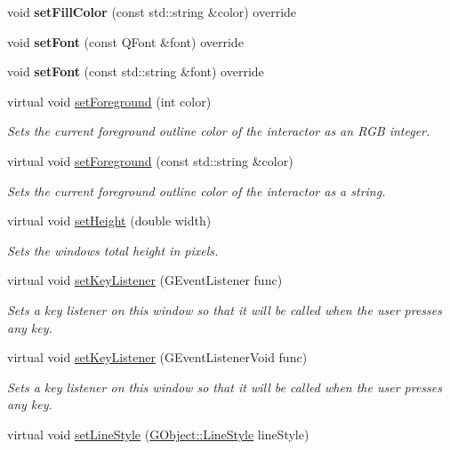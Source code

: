 \begin{DoxyCompactItemize}
void {\bfseries set\+Fill\+Color} (const std\+::string \&color) override
\item 
void {\bfseries set\+Font} (const Q\+Font \&font) override
\item 
void {\bfseries set\+Font} (const std\+::string \&font) override
\item 
virtual void \mbox{\hyperlink{classGDrawingSurface_a7daa57084b5811b598fce8726660b328}{set\+Foreground}} (int color)
\begin{DoxyCompactList}\small\item\em Sets the current foreground outline color of the interactor as an R\+GB integer. \end{DoxyCompactList}\item 
virtual void \mbox{\hyperlink{classGDrawingSurface_af59209aeadea6dfc6d97a2d8531f50e1}{set\+Foreground}} (const std\+::string \&color)
\begin{DoxyCompactList}\small\item\em Sets the current foreground outline color of the interactor as a string. \end{DoxyCompactList}\item 
virtual void \mbox{\hyperlink{classGWindow_a4b812426e19cdd9f6d62e7b5d90e6bec}{set\+Height}} (double width)
\begin{DoxyCompactList}\small\item\em Sets the window\textquotesingle{}s total height in pixels. \end{DoxyCompactList}\item 
virtual void \mbox{\hyperlink{classGWindow_aeb8324d3287fa1fbe093f4d6230cf0a6}{set\+Key\+Listener}} (G\+Event\+Listener func)
\begin{DoxyCompactList}\small\item\em Sets a key listener on this window so that it will be called when the user presses any key. \end{DoxyCompactList}\item 
virtual void \mbox{\hyperlink{classGWindow_ae48ecea73606c7bd9423e1c7cc589cc9}{set\+Key\+Listener}} (G\+Event\+Listener\+Void func)
\begin{DoxyCompactList}\small\item\em Sets a key listener on this window so that it will be called when the user presses any key. \end{DoxyCompactList}\item 
virtual void \mbox{\hyperlink{classGDrawingSurface_a6bfe14a77101db0fb97b5a7e07a5526b}{set\+Line\+Style}} (\mbox{\hyperlink{classGObject_a86e0f5648542856159bb40775c854aa7}{G\+Object\+::\+Line\+Style}} line\+Style)

\end{DoxyCompactItemize}
